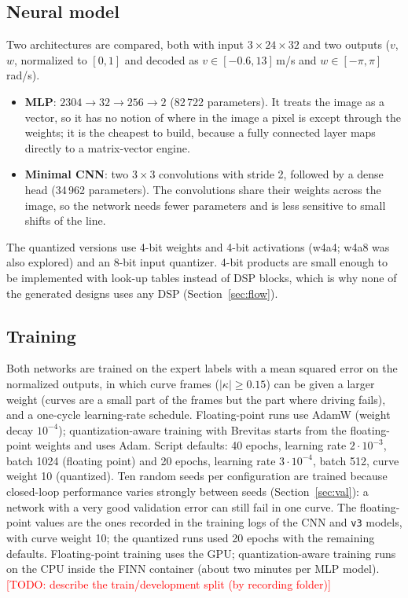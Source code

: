 \documentclass{article}
\newcommand{\TODO}[1]{\textcolor{red}{[TODO: #1]}}
\begin{document}
\subsection{Neural model}
Two architectures are compared, both with input $3{\times}24{\times}32$ and two outputs ($v$, $w$, normalized to $[0,1]$ and decoded as
$v\in[-0.6,13]$\,m/s and $w\in[-\pi,\pi]$\,rad/s).
\begin{itemize}
  \item \textbf{MLP}: $2304\rightarrow32\rightarrow256\rightarrow2$ (82\,722 parameters). It treats the image as a vector, so it has no notion of where in the image a pixel is
        except through the weights; it is the cheapest to build, because a fully connected layer maps directly to a matrix-vector engine.
  \item \textbf{Minimal CNN}: two $3{\times}3$ convolutions with stride 2, followed by a dense head (34\,962 parameters). The convolutions share their weights across the image,
        so the network needs fewer parameters and is less sensitive to small shifts of the line.
\end{itemize}
The quantized versions use 4-bit weights and 4-bit activations (w4a4; w4a8 was also explored) and an 8-bit input quantizer. 4-bit products are small enough to be implemented
with look-up tables instead of DSP blocks, which is why none of the generated designs uses any DSP (Section~\ref{sec:flow}).

\subsection{Training}
Both networks are trained on the expert labels with a mean squared error on the normalized outputs, in which curve frames ($|\kappa|\ge0.15$) can be
given a larger weight (curves are a small part of the frames but the part where driving fails), and a one-cycle learning-rate schedule. Floating-point runs use AdamW (weight decay $10^{-4}$); quantization-aware training
with Brevitas starts from the floating-point weights and uses Adam. Script defaults: 40 epochs, learning rate $2\cdot10^{-3}$, batch 1024 (floating point) and
20 epochs, learning rate $3\cdot10^{-4}$, batch 512, curve weight 10 (quantized). Ten random seeds per configuration are trained because
closed-loop performance varies strongly between seeds (Section~\ref{sec:val}): a network with a very good validation error can still fail in one curve.
The floating-point values are the ones recorded in the training logs of the CNN and \texttt{v3} models, with curve weight 10; the quantized runs used 20 epochs with the remaining defaults.
Floating-point training uses the GPU; quantization-aware training runs on the CPU inside the FINN container (about two minutes per MLP model).
\TODO{describe the train/development split (by recording folder)}
\end{document}
